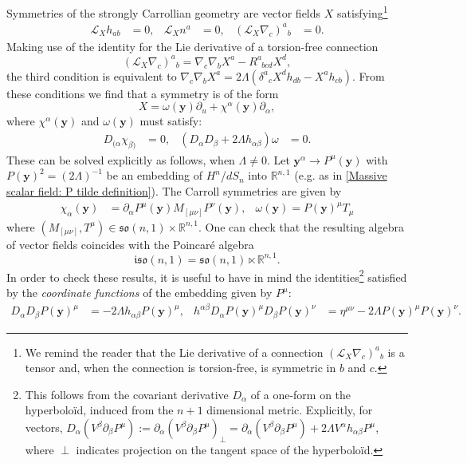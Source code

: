 \documentclass[a4paper, 10pt]{article}
\theoremstyle{remark}
\newcommand{\y}{\bm{y}}
\begin{document}
Symmetries of the strongly Carrollian geometry are vector fields $X$ satisfying\footnote{We remind the reader that the Lie derivative of a connection $\left(\mathcal{L}_X \nabla_c\right)^a{}_b$ is a tensor and, when the connection is torsion-free, is symmetric in $b$ and $c$.}
\begin{align*}
    \mathcal{L}_X h_{ab}&=0, & \mathcal{L}_X n^a&=0,  & \left(\mathcal{L}_X \nabla_c\right)^a{}_b &= 0.
\end{align*}
Making use of the identity for the Lie derivative of a torsion-free connection
\begin{equation}\label{Carrollian connection: Lie derivative of connection}
    \left(\mathcal{L}_X \nabla_c\right)^a{}_b = \nabla_c\nabla_b X^a -  R^a_{\phantom{a}bcd} X^d,
\end{equation}
 the third condition is equivalent to $\nabla_c\nabla_b X^a =2 \Lambda\left( \delta^a{}_c X^d  h_{db} - X^a h_{cb}\right)$. From these conditions we find that a symmetry is of the form
\begin{equation*}
    X =  \omega(\y) \partial_u + \chi^{\alpha}(\y) \partial_{\alpha} ,
\end{equation*}
where $\chi^{\alpha}(\y)$ and $\omega(\y)$ must satisfy:
\begin{align}
   D_{(\alpha} \chi_{\beta)}&=0, & \left(D_{\alpha}D_{\beta} + 2\Lambda h_{\alpha\beta} \right) \omega &=0.
\end{align}
These can be solved explicitly as follows, when $\Lambda \neq 0$. Let $\y^{\alpha} \to P^{\mu}(\y)$ with $P(\y)^2 = (2\Lambda)^{-1}$ be an embedding of $H^n$/$dS_{n}$ into $\mathbb{R}^{n,1}$ (e.g. as in \eqref{Massive scalar field: P tilde definition}). The Carroll symmetries are given by
\begin{align}
    \chi_{\alpha}(\y) &= \partial_{\alpha} P^{\mu}(\y) M_{[\mu\nu]} P^{\nu}(\y), &\omega(\y) = P(\y)^{\mu} T_{\mu}
\end{align}
where $(M_{[\mu\nu]},T^{\mu}) \in \mathfrak{so}(n,1) \times \mathbb{R}^{n,1}$. One can check that the resulting algebra of vector fields coincides with the Poincaré algebra
\begin{equation}
    \mathfrak{iso}(n,1) = \mathfrak{so}(n,1) \ltimes \mathbb{R}^{n,1}.
\end{equation}
In order to check these results, it is useful to have in mind the identities\footnote{This follows from the covariant derivative $D_\alpha$ of a one-form on the hyperboloïd, induced from the $n+1$ dimensional metric. Explicitly, for vectors, $D_{\alpha}(V^{\beta} \partial_{\beta} P^{\mu}) := \partial_{\alpha}\left(V^{\beta} \partial_{\beta} P^{\mu} \right)_{\perp} = \partial_{\alpha}\left(V^{\beta} \partial_{\beta}  P^{\mu} \right) + 2\Lambda V^{\alpha}h_{\alpha \beta } P^{\mu}$, where $\perp$ indicates projection on the tangent space of the hyperboloïd.} satisfied by the \emph{coordinate functions} of the embedding given by $P^{\mu}$:
\begin{align}\label{Flat model: identity on P}
    D_{\alpha}D_{\beta} P(\y)^{\mu} &= - 2 \Lambda h_{\alpha\beta} P(\y)^{\mu},&
    h^{\alpha \beta}D_\alpha  P(\y)^\mu  D_\beta P(\y)^\nu &= \eta^{\mu \nu} - 2 \Lambda P(\y)^\mu P(\y)^\nu.
\end{align}
\end{document}
